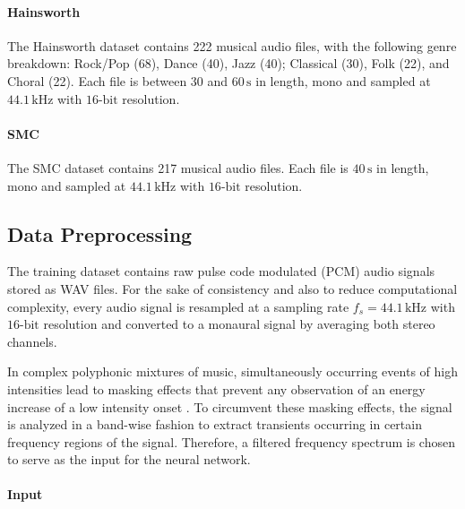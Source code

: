\documentclass{scrartcl}
\begin{document}
\paragraph{Hainsworth} 
The Hainsworth dataset \cite{Hainsworth2004} contains 222 musical audio files, with the following genre breakdown: Rock/Pop (68), Dance (40), Jazz (40); Classical (30), Folk (22), and Choral (22). Each file is between $30$ and $60\,\text{s}$ in length, mono and sampled at $44.1\,\text{kHz}$ with $16\text{-bit}$ resolution.

\paragraph{SMC}
The SMC dataset \cite{Holzapfel2012} contains 217 musical audio files. Each file is $40 \,\text{s}$ in length, mono and sampled at $44.1\,\text{kHz}$ with $16\text{-bit}$ resolution.


\subsection{Data Preprocessing}

The training dataset contains raw pulse code modulated (PCM) audio signals stored as WAV files. For the sake of consistency and also to reduce computational complexity, every audio signal is resampled at a sampling rate $f_s = 44.1 \,\text{kHz}$ with $16\text{-bit}$ resolution and converted to a monaural signal by averaging both stereo channels. 

In complex polyphonic mixtures of music, simultaneously occurring events of high intensities lead to masking effects that prevent any observation of an energy increase of a low intensity onset \cite{Grosche2010}. To circumvent these masking effects, the signal is analyzed in a band-wise fashion to extract transients occurring in certain frequency regions of the signal. Therefore, a filtered frequency spectrum is chosen to serve as the input for the neural network.


\paragraph{Input}
\end{document}
